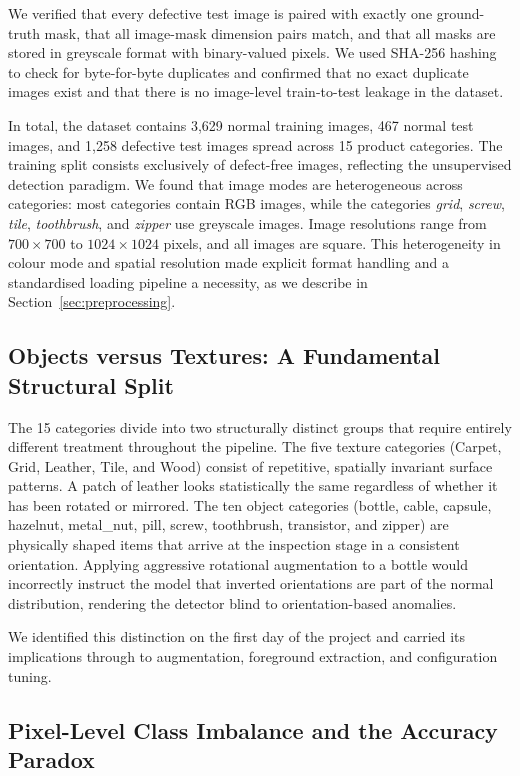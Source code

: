 \documentclass[11pt, a4paper]{article}
\begin{document}
We verified that every defective test image is paired with exactly one ground-truth mask, that all image-mask dimension pairs match, and that all masks are stored in greyscale format with binary-valued pixels. We used SHA-256 hashing to check for byte-for-byte duplicates and confirmed that no exact duplicate images exist and that there is no image-level train-to-test leakage in the dataset.

In total, the dataset contains 3,629 normal training images, 467 normal test images, and 1,258 defective test images spread across 15 product categories. The training split consists exclusively of defect-free images, reflecting the unsupervised detection paradigm. We found that image modes are heterogeneous across categories: most categories contain RGB images, while the categories \textit{grid}, \textit{screw}, \textit{tile}, \textit{toothbrush}, and \textit{zipper} use greyscale images. Image resolutions range from $700 \times 700$ to $1024 \times 1024$ pixels, and all images are square. This heterogeneity in colour mode and spatial resolution made explicit format handling and a standardised loading pipeline a necessity, as we describe in Section~\ref{sec:preprocessing}.

\subsection{Objects versus Textures: A Fundamental Structural Split}

The 15 categories divide into two structurally distinct groups that require entirely different treatment throughout the pipeline. The five texture categories (Carpet, Grid, Leather, Tile, and Wood) consist of repetitive, spatially invariant surface patterns. A patch of leather looks statistically the same regardless of whether it has been rotated or mirrored. The ten object categories (bottle, cable, capsule, hazelnut, metal\_nut, pill, screw, toothbrush, transistor, and zipper) are physically shaped items that arrive at the inspection stage in a consistent orientation. Applying aggressive rotational augmentation to a bottle would incorrectly instruct the model that inverted orientations are part of the normal distribution, rendering the detector blind to orientation-based anomalies.

We identified this distinction on the first day of the project and carried its implications through to augmentation, foreground extraction, and configuration tuning.

\subsection{Pixel-Level Class Imbalance and the Accuracy Paradox}
\label{sec:imbalance}
\end{document}

